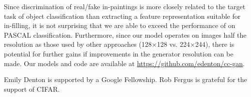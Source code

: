 \documentclass{article} \usepackage{iclr2017_conference,times}
\begin{document}
Since discrimination of real/fake in-paintings is more closely related
to the target task of object classification than extracting a feature
representation suitable for in-filling, it is not surprising that we
are able to exceed the performance of \cite{pathak2016}
on PASCAL classification.  Furthermore, since our model operates on
images half the resolution as those used by other approaches
(128$\times$128 vs. 224$\times$244), there is potential for further
gains if improvements in the generator resolution can be made. Our models and code are available at \url{https://github.com/edenton/cc-gan}.


 Emily Denton is supported by a
Google Fellowship. Rob Fergus is grateful for the support of CIFAR.

\small
 

\end{document}
